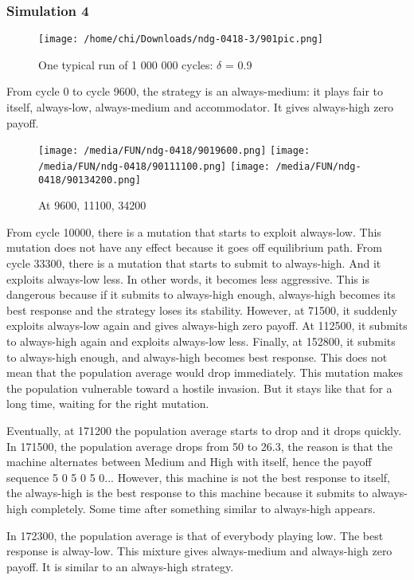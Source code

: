 \documentclass[12.5pt]{report}
\begin{document}
\subsubsection{Simulation 4}

\begin{figure}[h!]
\center
\texttt{[image: /home/chi/Downloads/ndg-0418-3/901pic.png]}
\caption{One typical run of 1 000 000 cycles: $\delta$ = 0.9}
\end{figure}

From cycle 0 to cycle 9600, the strategy is an always-medium: it plays fair to itself, always-low, always-medium and accommodator. It gives always-high zero payoff.
\begin{figure}[h!]
\center
\texttt{[image: /media/FUN/ndg-0418/9019600.png]}
\texttt{[image: /media/FUN/ndg-0418/90111100.png]}
\texttt{[image: /media/FUN/ndg-0418/90134200.png]}

\caption{At 9600, 11100, 34200}
\end{figure}
From cycle 10000, there is a mutation that starts to exploit always-low. This mutation does not have any effect because it goes off equilibrium path. From cycle 33300, there is a mutation that starts to submit to always-high. And it exploits always-low less. In other words, it becomes less aggressive. This is dangerous because if it submits to always-high enough, always-high becomes its best response and the strategy loses its stability. However, at 71500, it suddenly exploits always-low again and gives always-high zero payoff. At 112500, it submits to always-high again and exploits always-low less. Finally, at 152800, it submits to always-high enough, and always-high becomes best response. This does not mean that the population average would drop immediately. This mutation makes the population vulnerable toward a hostile invasion. But it stays like that for a long time, waiting for the right mutation. 

Eventually, at 171200 the population average starts to drop and it drops quickly. In 171500, the population average drops from 50 to 26.3, the reason is that the machine alternates between Medium and High with itself, hence the payoff sequence 5 0 5 0 5 0... However, this machine is not the best response to itself, the always-high is the best response to this machine because it submits to always-high completely. Some time after something similar to always-high appears.

In 172300, the population average is that of everybody playing low. The best response is alway-low. This mixture gives always-medium and always-high zero payoff. It is similar to an always-high strategy. 
\end{document}
